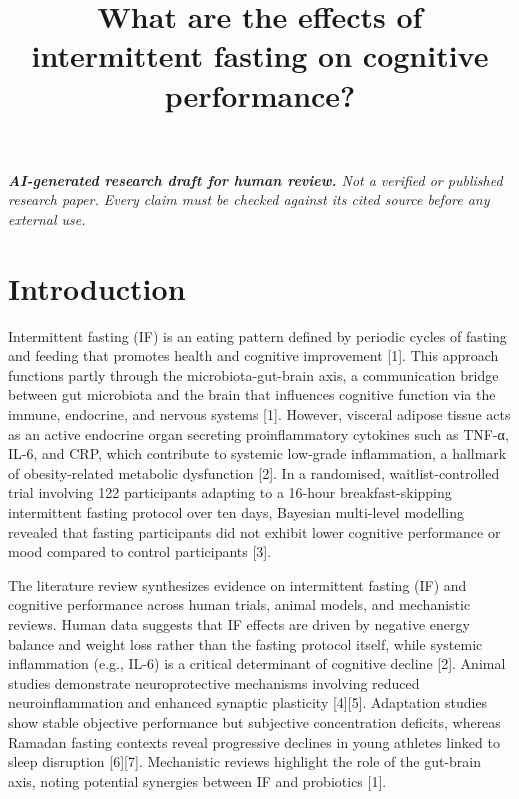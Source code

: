 \documentclass[conference]{IEEEtran}
\title{What are the effects of intermittent fasting on cognitive performance?}
\author{\IEEEauthorblockN{ResearchGenie}\IEEEauthorblockA{AI-generated research draft}}
\begin{document}
\maketitle
\textit{\textbf{AI-generated research draft for human review.} Not a verified or published research paper. Every claim must be checked against its cited source before any external use.}\par

\section{Introduction}
Intermittent fasting (IF) is an eating pattern defined by periodic cycles of fasting and feeding that promotes health and cognitive improvement [1]. This approach functions partly through the microbiota-gut-brain axis, a communication bridge between gut microbiota and the brain that influences cognitive function via the immune, endocrine, and nervous systems [1]. However, visceral adipose tissue acts as an active endocrine organ secreting proinflammatory cytokines such as TNF-α, IL-6, and CRP, which contribute to systemic low-grade inflammation, a hallmark of obesity-related metabolic dysfunction [2]. In a randomised, waitlist-controlled trial involving 122 participants adapting to a 16-hour breakfast-skipping intermittent fasting protocol over ten days, Bayesian multi-level modelling revealed that fasting participants did not exhibit lower cognitive performance or mood compared to control participants [3].

The literature review synthesizes evidence on intermittent fasting (IF) and cognitive performance across human trials, animal models, and mechanistic reviews. Human data suggests that IF effects are driven by negative energy balance and weight loss rather than the fasting protocol itself, while systemic inflammation (e.g., IL-6) is a critical determinant of cognitive decline [2]. Animal studies demonstrate neuroprotective mechanisms involving reduced neuroinflammation and enhanced synaptic plasticity [4][5]. Adaptation studies show stable objective performance but subjective concentration deficits, whereas Ramadan fasting contexts reveal progressive declines in young athletes linked to sleep disruption [6][7]. Mechanistic reviews highlight the role of the gut-brain axis, noting potential synergies between IF and probiotics [1].
\end{document}
